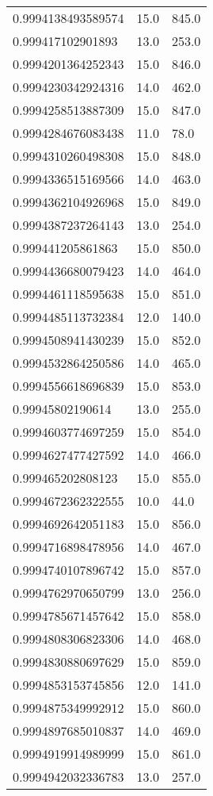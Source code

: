 \begin{center}
\begin{supertabular}[H]{p{0.30\textwidth}p{0.05\textwidth}p{0.05\textwidth}}
0.9994138493589574 & 15.0 & 845.0 \\ 
0.999417102901893 & 13.0 & 253.0 \\ 
0.9994201364252343 & 15.0 & 846.0 \\ 
0.9994230342924316 & 14.0 & 462.0 \\ 
0.9994258513887309 & 15.0 & 847.0 \\ 
0.9994284676083438 & 11.0 & 78.0 \\ 
0.9994310260498308 & 15.0 & 848.0 \\ 
0.9994336515169566 & 14.0 & 463.0 \\ 
0.9994362104926968 & 15.0 & 849.0 \\ 
0.9994387237264143 & 13.0 & 254.0 \\ 
0.999441205861863 & 15.0 & 850.0 \\ 
0.9994436680079423 & 14.0 & 464.0 \\ 
0.9994461118595638 & 15.0 & 851.0 \\ 
0.9994485113732384 & 12.0 & 140.0 \\ 
0.9994508941430239 & 15.0 & 852.0 \\ 
0.9994532864250586 & 14.0 & 465.0 \\ 
0.9994556618696839 & 15.0 & 853.0 \\ 
0.99945802190614 & 13.0 & 255.0 \\ 
0.9994603774697259 & 15.0 & 854.0 \\ 
0.9994627477427592 & 14.0 & 466.0 \\ 
0.999465202808123 & 15.0 & 855.0 \\ 
0.9994672362322555 & 10.0 & 44.0 \\ 
0.9994692642051183 & 15.0 & 856.0 \\ 
0.9994716898478956 & 14.0 & 467.0 \\ 
0.9994740107896742 & 15.0 & 857.0 \\ 
0.9994762970650799 & 13.0 & 256.0 \\ 
0.9994785671457642 & 15.0 & 858.0 \\ 
0.9994808306823306 & 14.0 & 468.0 \\ 
0.9994830880697629 & 15.0 & 859.0 \\ 
0.9994853153745856 & 12.0 & 141.0 \\ 
0.9994875349992912 & 15.0 & 860.0 \\ 
0.9994897685010837 & 14.0 & 469.0 \\ 
0.9994919914989999 & 15.0 & 861.0 \\ 
0.9994942032336783 & 13.0 & 257.0 \\ 

\end{supertabular}
\end{center}
